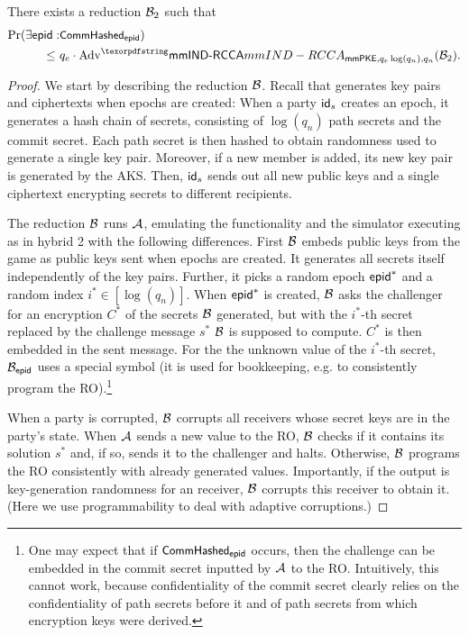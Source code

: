 \begin{lemma}
  There exists a reduction $\Bdv[2]$ such that
  \begin{align*}
    \Pr(\exists \hgnodeid : &\commitHash_{\hgnodeid}) \\ \leq\ & q_e\cdot\textnormal{Adv}^\mmindrcca_{\mmPKE,q_e\log(q_n),q_n}(\Bdv[2]).
  \end{align*}
\end{lemma}
\begin{proof}
We start by describing the reduction $\Bdv$. Recall that \saik generates \mmPKE key pairs and ciphertexts when epochs are created: When a party $\id_s$ creates an epoch, it generates a hash chain of secrets, consisting of $\log(q_n)$ path secrets and the commit secret. Each path secret is then hashed to obtain randomness used to generate a single key pair. Moreover, if a new member is added, its new \mmPKE key pair is generated by the AKS. Then, $\id_s$ sends out all new public keys and a single ciphertext encrypting secrets to different recipients.

The reduction $\Bdv$ runs $\Adv$, emulating the functionality and the simulator executing \saik as in hybrid 2 with the following differences. First $\Bdv$ embeds public keys from the \mmowrcca game as public keys sent when epochs are created. It generates all secrets itself independently of the key pairs. Further, it picks a random epoch $\hgnodeid^*$ and a random index $i^* \in [\log(q_n)]$. When $\hgnodeid^*$ is created, $\Bdv$ asks the challenger for an encryption $C^*$ of the secrets $\Bdv$ generated, but with the $i^*$-th secret replaced by the challenge message $s^*$ $\Bdv$ is supposed to compute. $C^*$ is then embedded in the sent message. For the the unknown value of the $i^*$-th secret, $\Bdv[\hgnodeid]$ uses a special symbol  (it is used for bookkeeping, e.g. to consistently program the RO).\footnote{One
  may expect that if $\commitHash_\hgnodeid$ occurs, then the challenge can be embedded in the commit secret inputted by $\Adv$ to the RO. Intuitively, this cannot work, because confidentiality of the commit secret clearly relies on the confidentiality of path secrets before it and of path secrets from which encryption keys were derived.
}

When a party is corrupted, $\Bdv$ corrupts all receivers whose secret keys are in the party's state. When $\Adv$ sends a new value to the RO, $\Bdv$ checks if it contains its solution $s^*$ and, if so, sends it to the challenger and halts. Otherwise, $\Bdv$ programs the RO consistently with already generated values. Importantly, if the output is key-generation randomness for an \mmowrcca receiver, $\Bdv$ corrupts this receiver to obtain it. (Here we use programmability to deal with adaptive corruptions.)


\end{proof}
